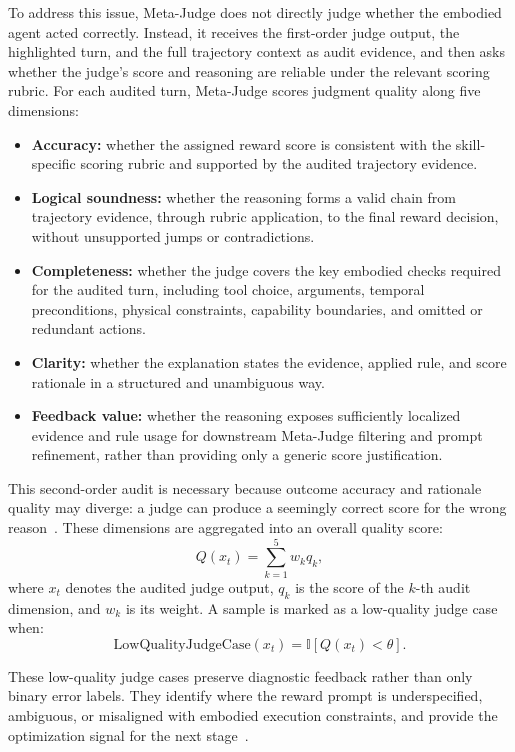 To address this issue, Meta-Judge does not directly judge whether the embodied agent acted correctly. Instead, it receives the first-order judge output, the highlighted turn, and the full trajectory context as audit evidence, and then asks whether the judge's score and reasoning are reliable under the relevant scoring rubric. For each audited turn, Meta-Judge scores judgment quality along five dimensions:
\begin{itemize}
    \item \textbf{Accuracy:} whether the assigned reward score is consistent with the skill-specific scoring rubric and supported by the audited trajectory evidence.
    \item \textbf{Logical soundness:} whether the reasoning forms a valid chain from trajectory evidence, through rubric application, to the final reward decision, without unsupported jumps or contradictions.
    \item \textbf{Completeness:} whether the judge covers the key embodied checks required for the audited turn, including tool choice, arguments, temporal preconditions, physical constraints, capability boundaries, and omitted or redundant actions.
    \item \textbf{Clarity:} whether the explanation states the evidence, applied rule, and score rationale in a structured and unambiguous way.
    \item \textbf{Feedback value:} whether the reasoning exposes sufficiently localized evidence and rule usage for downstream Meta-Judge filtering and prompt refinement, rather than providing only a generic score justification.
\end{itemize}

This second-order audit is necessary because outcome accuracy and rationale quality may diverge: a judge can produce a seemingly correct score for the wrong reason~\citep{wang2026outcome}. These dimensions are aggregated into an overall quality score:
\begin{equation}
Q(x_t)=\sum_{k=1}^{5} w_k q_k,
\label{eq:meta_quality}
\end{equation}
where $x_t$ denotes the audited judge output, $q_k$ is the score of the $k$-th audit dimension, and $w_k$ is its weight. A sample is marked as a low-quality judge case when:
\begin{equation}
\mathrm{LowQualityJudgeCase}(x_t)=\mathbb{I}[Q(x_t)<\theta].
\label{eq:low_quality_case}
\end{equation}

These low-quality judge cases preserve diagnostic feedback rather than only binary error labels. They identify where the reward prompt is underspecified, ambiguous, or misaligned with embodied execution constraints, and provide the optimization signal for the next stage~\citep{li2025multiagent}.

